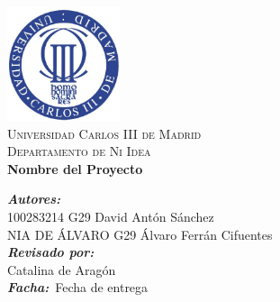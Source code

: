 \begin{titlepage}

\begin{center}


\includegraphics[width=0.25\textwidth]{./uc3m.jpg}\\[2cm]    
\textsc{\huge Universidad Carlos III de Madrid}\\[0.5cm]
\textsc{\Large Departamento de Ni Idea}\\[4cm]


{\LARGE \bfseries{Nombre del Proyecto}\\[4.5cm]}


\end{center}
\setlength{\parindent}{0cm}


\vspace{10pt}
\emph{\bfseries{Autores:}}\\
100283214 G29 David Antón Sánchez\\
NIA DE ÁLVARO G29 Álvaro Ferrán Cifuentes\\




\emph{\bfseries{Revisado por:}}\\
Catalina de Aragón\\




\emph{\bfseries{Facha:}}\ Fecha de entrega\\







\vfill





\end{titlepage}